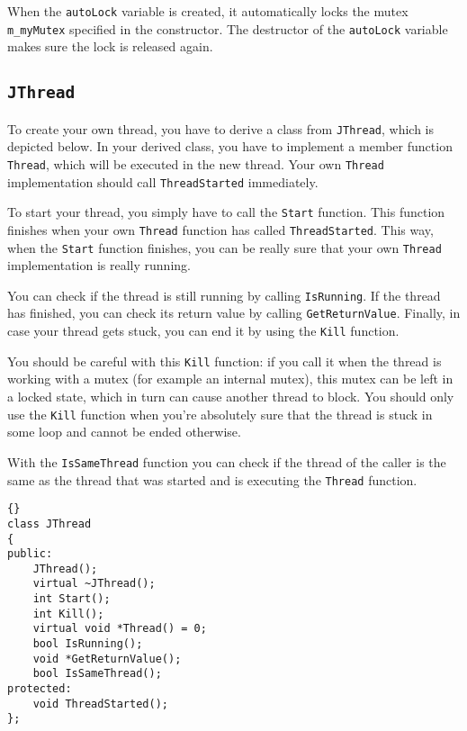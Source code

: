 \documentclass[a4paper,12pt]{article}
\begin{document}
	When the {\tt autoLock} variable is created, it automatically locks the
	mutex {\tt m\_myMutex} specified in the constructor. The destructor of
	the {\tt autoLock} variable makes sure the lock is released again.

	\subsection{{\tt JThread}}
	
	To create your own thread, you have to derive a class from {\tt JThread},
	which is depicted below. In your derived class, you have to implement
	a member function {\tt Thread}, which will be executed in the new thread.
	Your own {\tt Thread} implementation should call {\tt ThreadStarted}
	immediately.

	To start your thread, you simply have to call the {\tt Start} function.
	This function finishes when your own {\tt Thread} function has called
	{\tt ThreadStarted}. This way, when the {\tt Start} function
	finishes, you can be really sure that your own {\tt Thread} implementation
	is really running.

	You can check if the thread is still running by calling {\tt IsRunning}.
	If the thread has finished, you can check its return value by calling
	{\tt GetReturnValue}. Finally, in case your thread gets stuck, you can
	end it by using the {\tt Kill} function.

	You should be careful with this {\tt Kill} function: if you call it when
	the thread is working with a mutex (for example an internal mutex), this
	mutex can be left in a locked state, which in turn can cause another thread
	to block. You should only use the {\tt Kill} function when you're absolutely
	sure that the thread is stuck in some loop and cannot be ended otherwise.

	With the {\tt IsSameThread} function you can check if the thread of the
	caller is the same as the thread that was started and is executing the
	{\tt Thread} function.
\begin{lstlisting}[frame=tb]{}
class JThread
{
public:
	JThread();
	virtual ~JThread();
	int Start();
	int Kill();
	virtual void *Thread() = 0;
	bool IsRunning();
	void *GetReturnValue();
	bool IsSameThread();
protected:
	void ThreadStarted();
};
\end{lstlisting}
	
\end{document}
